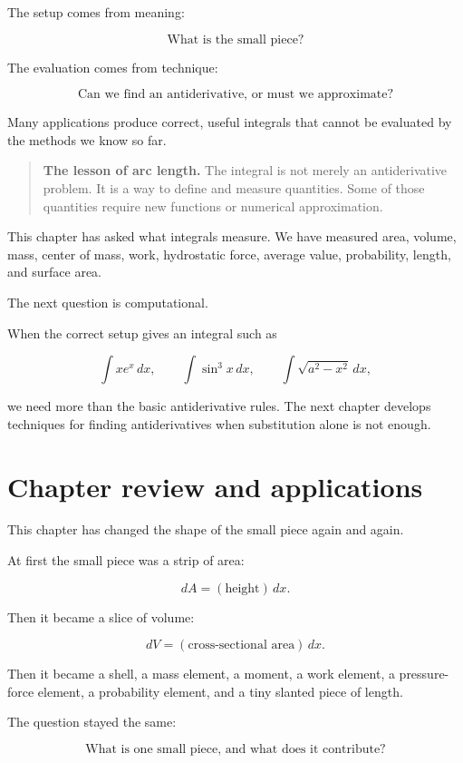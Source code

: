 The setup comes from meaning:

\[
\text{What is the small piece?}
\]

The evaluation comes from technique:

\[
\text{Can we find an antiderivative, or must we approximate?}
\]

Many applications produce correct, useful integrals that cannot be evaluated by the
methods we know so far.

\begin{quote}
\textbf{The lesson of arc length.}
The integral is not merely an antiderivative problem.  It is a way to define and measure
quantities.  Some of those quantities require new functions or numerical approximation.
\end{quote}

This chapter has asked what integrals measure.  We have measured area, volume, mass,
center of mass, work, hydrostatic force, average value, probability, length, and surface
area.

The next question is computational.

When the correct setup gives an integral such as

\[
\int x e^x\,dx,
\qquad
\int \sin^3 x\,dx,
\qquad
\int \sqrt{a^2-x^2}\,dx,
\]

we need more than the basic antiderivative rules.  The next chapter develops techniques
for finding antiderivatives when substitution alone is not enough.
\section{Chapter review and applications}
\label{sec:chapter10-review-applications}

This chapter has changed the shape of the small piece again and again.

At first the small piece was a strip of area:

\[
dA=(\text{height})\,dx.
\]

Then it became a slice of volume:

\[
dV=(\text{cross-sectional area})\,dx.
\]

Then it became a shell, a mass element, a moment, a work element, a pressure-force
element, a probability element, and a tiny slanted piece of length.

The question stayed the same:

\[
\boxed{
\text{What is one small piece, and what does it contribute?}
}
\]

